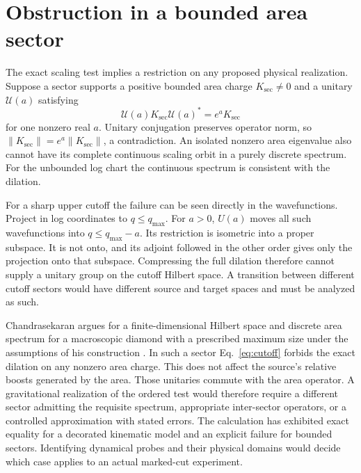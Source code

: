 \documentclass[11pt,letterpaper]{article}
\begin{document}
\section{Obstruction in a bounded area sector}

The exact scaling test implies a restriction on any proposed physical realization. Suppose a sector supports a positive bounded area charge $K_{\mathrm{sec}}\ne0$ and a unitary $\mathcal U(a)$ satisfying
\begin{equation}
 \mathcal U(a)K_{\mathrm{sec}}\mathcal U(a)^*=e^aK_{\mathrm{sec}}
 \label{eq:cutoff}
\end{equation}
for one nonzero real $a$. Unitary conjugation preserves operator norm, so $\|K_{\mathrm{sec}}\|=e^a\|K_{\mathrm{sec}}\|$, a contradiction. An isolated nonzero area eigenvalue also cannot have its complete continuous scaling orbit in a purely discrete spectrum. For the unbounded log chart the continuous spectrum is consistent with the dilation.

For a sharp upper cutoff the failure can be seen directly in the wavefunctions. Project in log coordinates to $q\le q_{\max}$. For $a>0$, $U(a)$ moves all such wavefunctions into $q\le q_{\max}-a$. Its restriction is isometric into a proper subspace. It is not onto, and its adjoint followed in the other order gives only the projection onto that subspace. Compressing the full dilation therefore cannot supply a unitary group on the cutoff Hilbert space. A transition between different cutoff sectors would have different source and target spaces and must be analyzed as such.

Chandrasekaran argues for a finite-dimensional Hilbert space and discrete area spectrum for a macroscopic diamond with a prescribed maximum size under the assumptions of his construction \cite[Sec.~5.2]{nc}. In such a sector Eq.~\eqref{eq:cutoff} forbids the exact dilation on any nonzero area charge. This does not affect the source's relative boosts generated by the area. Those unitaries commute with the area operator. A gravitational realization of the ordered test would therefore require a different sector admitting the requisite spectrum, appropriate inter-sector operators, or a controlled approximation with stated errors. The calculation has exhibited exact equality for a decorated kinematic model and an explicit failure for bounded sectors. Identifying dynamical probes and their physical domains would decide which case applies to an actual marked-cut experiment.
\end{document}
